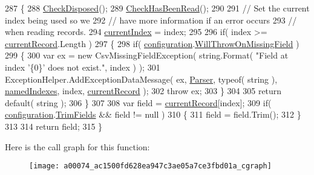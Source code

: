 \begin{DoxyCode}
287         \{
288             \hyperlink{a00074_a6fa45a46ed1322dc1872ca2321b5edbc}{CheckDisposed}();
289             \hyperlink{a00074_a2d9249171ed1568e45d152766d364c31}{CheckHasBeenRead}();
290 
291             \textcolor{comment}{// Set the current index being used so we}
292             \textcolor{comment}{// have more information if an error occurs}
293             \textcolor{comment}{// when reading records.}
294             \hyperlink{a00074_a56e974bc7e2242912e956393e831e166}{currentIndex} = index;
295 
296             \textcolor{keywordflow}{if}( index >= \hyperlink{a00074_ab2bfef15784add66e441c9d3a0d73751}{currentRecord}.Length )
297             \{
298                 \textcolor{keywordflow}{if}( \hyperlink{a00074_a695622911e45cbac8d67dcbd9a3e2967}{configuration}.\hyperlink{a00060_a13cb7999b190a01177134faa52dfa3db}{WillThrowOnMissingField} )
299                 \{
300                     var ex = \textcolor{keyword}{new} CsvMissingFieldException( \textcolor{keywordtype}{string}.Format( \textcolor{stringliteral}{"Field at index '\{0\}' does not
       exist."}, index ) );
301                     ExceptionHelper.AddExceptionDataMessage( ex, \hyperlink{a00074_a67874ae540cf6cf32522a38167a3f3b6}{Parser}, typeof( \textcolor{keywordtype}{string} ), 
      \hyperlink{a00074_a3114f49bd2b3c4966f4b15a310747aeb}{namedIndexes}, index, \hyperlink{a00074_ab2bfef15784add66e441c9d3a0d73751}{currentRecord} );
302                     \textcolor{keywordflow}{throw} ex;
303                 \}
304 
305                 \textcolor{keywordflow}{return} \textcolor{keywordflow}{default}( \textcolor{keywordtype}{string} );
306             \}
307 
308             var field = \hyperlink{a00074_ab2bfef15784add66e441c9d3a0d73751}{currentRecord}[index];
309             \textcolor{keywordflow}{if}( \hyperlink{a00074_a695622911e45cbac8d67dcbd9a3e2967}{configuration}.\hyperlink{a00060_a100f3a2268218bfba3088f4ca1d6a7ad}{TrimFields} && field != null )
310             \{
311                 field = field.Trim();
312             \}
313 
314             \textcolor{keywordflow}{return} field;
315         \}
\end{DoxyCode}


Here is the call graph for this function\-:
\nopagebreak
\begin{figure}[H]
\begin{center}
\leavevmode
\texttt{[image: a00074\_ac1500fd628ea947c3ae05a7ce3fbd01a\_cgraph]}
\end{center}
\end{figure}




